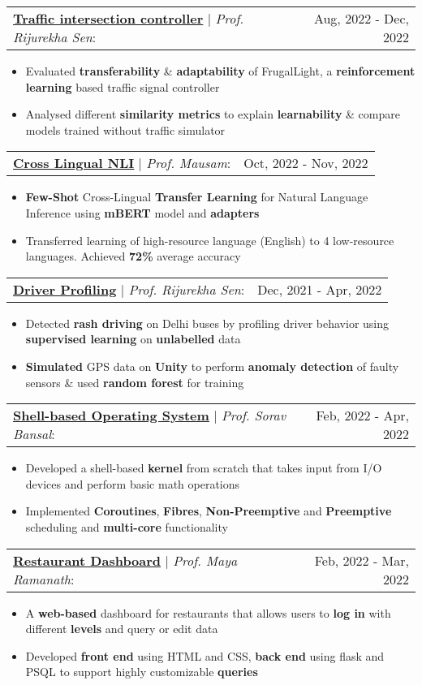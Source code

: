 \documentclass[letterpaper,11pt]{article}
\makeatletter
\newcommand{\resumeItem}[1]{
  \item\small{
    {#1 \vspace{-2pt}}
  }
}
\newcommand{\headingStart}{
  \begin{tabular*}{0.97\textwidth}[t]{l@{\extracolsep{\fill}}r}
}
\newcommand{\projectHeading}[3]{
    \item
    \headingStart
      \underline{\textbf{#1}} $|$ \textit{#2}: & #3 \\
    \end{tabular*}\vspace{-7pt}
}
\newcommand{\itemListStart}[1]
  {\begin{itemize}[leftmargin=#1in, rightmargin=0in]}
\newcommand{\itemListEnd}{\end{itemize}\vspace{-5pt}}
\makeatother
\begin{document}
      \projectHeading
        {Traffic intersection controller}
        {Prof. Rijurekha Sen}
        {Aug, 2022 - Dec, 2022}
        \itemListStart{0.2}
          \resumeItem{Evaluated \textbf{transferability} \& \textbf{adaptability} of FrugalLight, a \textbf{reinforcement learning} based traffic signal controller}
          \resumeItem{Analysed different \textbf{similarity metrics} to explain \textbf{learnability} \& compare models trained without traffic simulator}
        \itemListEnd
      
      \projectHeading
        {\href{https://github.com/its-sachin/Multilingual-NLI}{Cross Lingual NLI}}
        {Prof. Mausam}
        {Oct, 2022 - Nov, 2022}
        \itemListStart{0.2}
          \resumeItem{\textbf{Few-Shot} Cross-Lingual \textbf{Transfer Learning} for Natural Language Inference using \textbf{mBERT} model and \textbf{adapters}}
          \resumeItem{Transferred learning of high-resource language (English) to 4 low-resource languages. Achieved \textbf{72\%} average accuracy}
        \itemListEnd


      \projectHeading
        {Driver Profiling}
        {Prof. Rijurekha Sen}
        {Dec, 2021 - Apr, 2022}
        \itemListStart{0.2}
          \resumeItem{Detected \textbf{rash driving} on Delhi buses by profiling driver behavior using \textbf{supervised learning} on \textbf{unlabelled} data}
          \resumeItem{\textbf{Simulated} GPS data on \textbf{Unity} to perform \textbf{anomaly detection} of faulty sensors \& used \textbf{random forest} for training}
        \itemListEnd


      \projectHeading
        {Shell-based Operating System}
        {Prof. Sorav Bansal}
        {Feb, 2022 - Apr, 2022}
        \itemListStart{0.2}
          \resumeItem{Developed a shell-based \textbf{kernel} from scratch that takes input from I/O devices and perform basic math operations}
          \resumeItem{Implemented \textbf{Coroutines}, \textbf{Fibres}, \textbf{Non-Preemptive} and \textbf{Preemptive} scheduling and \textbf{multi-core} functionality}
        \itemListEnd

      \projectHeading
        {Restaurant Dashboard}
        {Prof. Maya Ramanath}
        {Feb, 2022 - Mar, 2022}
        \itemListStart{0.2}
          \resumeItem{A \textbf{web-based} dashboard for restaurants that allows users to \textbf{log in} with different \textbf{levels} and query or edit data}
          \resumeItem{Developed \textbf{front end} using HTML and CSS, \textbf{back end} using flask and PSQL to support highly customizable \textbf{queries}}
        \itemListEnd
\end{document}
